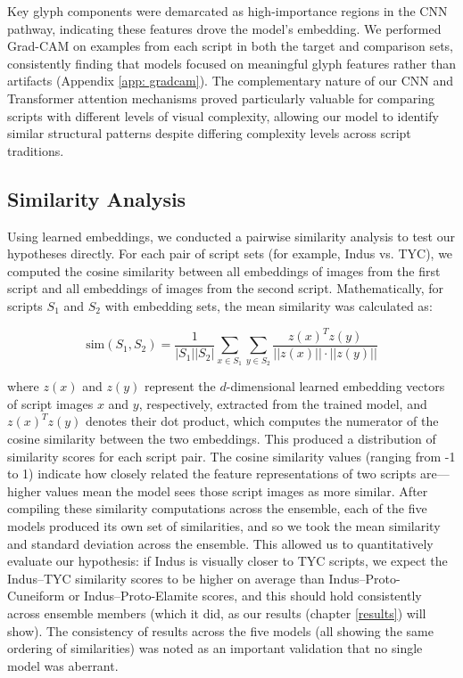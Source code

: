 \documentclass[11pt,a4paper,oneside]{report}
\begin{document}
Key glyph components were demarcated as high-importance regions in the CNN pathway, indicating these features drove the model's embedding. We performed Grad-CAM on examples from each script in both the target and comparison sets, consistently finding that models focused on meaningful glyph features rather than artifacts (Appendix \ref{app: gradcam}). The complementary nature of our CNN and Transformer attention mechanisms proved particularly valuable for comparing scripts with different levels of visual complexity, allowing our model to identify similar structural patterns despite differing complexity levels across script traditions.

\subsection{Similarity Analysis}
\noindent\hspace{1cm}
Using learned embeddings, we conducted a pairwise similarity analysis to test our hypotheses directly. For each pair of script sets (for example, Indus vs. TYC), we computed the cosine similarity between all embeddings of images from the first script and all embeddings of images from the second script. Mathematically, for scripts $S_1$ and $S_2$ with embedding sets, the mean similarity was calculated as:

\begin{equation}
\text{sim}(S_1, S_2) = \frac{1}{|S_1||S_2|}\sum_{x \in S_1}\sum_{y \in S_2}\frac{z(x)^T z(y)}{||z(x)|| \cdot ||z(y)||}
\end{equation}

where $z(x)$ and $z(y)$ represent the $d$-dimensional learned embedding vectors of script images $x$ and $y$, respectively, extracted from the trained model, and $z(x)^T z(y)$ denotes their dot product, which computes the numerator of the cosine similarity between the two embeddings.
This produced a distribution of similarity scores for each script pair. The cosine similarity values (ranging from -1 to 1) indicate how closely related the feature representations of two scripts are—higher values mean the model sees those script images as more similar. After compiling these similarity computations across the ensemble, each of the five models produced its own set of similarities, and so we took the mean similarity and standard deviation across the ensemble. This allowed us to quantitatively evaluate our hypothesis: if Indus is visually closer to TYC scripts, we expect the Indus–TYC similarity scores to be higher on average than Indus–Proto-Cuneiform or Indus–Proto-Elamite scores, and this should hold consistently across ensemble members (which it did, as our results (chapter \ref{results}) will show). The consistency of results across the five models (all showing the same ordering of similarities) was noted as an important validation that no single model was aberrant.
\end{document}
